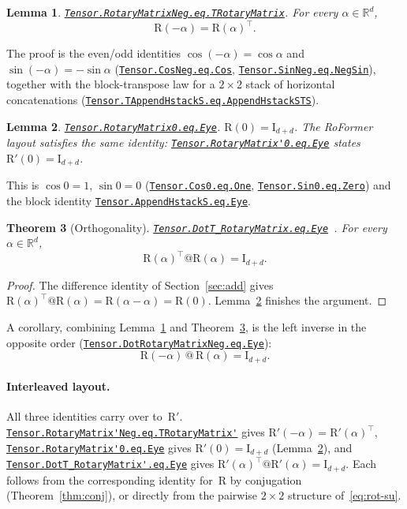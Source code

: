 \documentclass[11pt,a4paper]{article}
\newcommand{\lmod}[1]{\href{http://www.lemma.cn/lean/?module=#1}{\nolinkurl{#1}}}
\newtheorem{theorem}{Theorem}[section]
\newtheorem{lemma}[theorem]{Lemma}
\newcommand{\R}{\mathbb{R}}
\newcommand{\rot}{\mathrm{R}}
\newcommand{\eye}{\mathrm{I}}
\begin{document}
\begin{lemma}
\label{lem:neg-T}
\lmod{Tensor.RotaryMatrixNeg.eq.TRotaryMatrix}.
For every \(\alpha\in\R^d\),
\begin{equation}
  \rot(-\alpha) = \rot(\alpha)^\top.
\end{equation}
\end{lemma}

The proof is the even/odd identities \(\cos(-\alpha)=\cos\alpha\) and \(\sin(-\alpha)=-\sin\alpha\)
(\lmod{Tensor.CosNeg.eq.Cos}, \lmod{Tensor.SinNeg.eq.NegSin}),
together with the block-transpose law for a \(2\times 2\) stack of horizontal concatenations
(\lmod{Tensor.TAppendHstackS.eq.AppendHstackSTS}).

\begin{lemma}
\label{lem:R0}
\lmod{Tensor.RotaryMatrix0.eq.Eye}.
\(\rot(0)=\eye_{d+d}\).
The RoFormer layout satisfies the same identity:
\lmod{Tensor.RotaryMatrix'0.eq.Eye} states \(\rot'(0)=\eye_{d+d}\).
\end{lemma}

This is \(\cos 0=1\), \(\sin 0=0\)
(\lmod{Tensor.Cos0.eq.One}, \lmod{Tensor.Sin0.eq.Zero})
and the block identity
\lmod{Tensor.AppendHstackS.eq.Eye}.

\begin{theorem}[Orthogonality]
\label{thm:orth}
\lmod{Tensor.DotT_RotaryMatrix.eq.Eye}~\cite{lemma_rope_orth}.
For every \(\alpha\in\R^d\),
\begin{equation}
  \rot(\alpha)^\top @ \rot(\alpha) = \eye_{d+d}.
\end{equation}
\end{theorem}

\begin{proof}
The difference identity of Section~\ref{sec:add} gives
\(\rot(\alpha)^\top @ \rot(\alpha)=\rot(\alpha-\alpha)=\rot(0)\).
Lemma~\ref{lem:R0} finishes the argument.
\end{proof}

A corollary, combining Lemma~\ref{lem:neg-T} and Theorem~\ref{thm:orth}, is the left inverse in the opposite order
(\lmod{Tensor.DotRotaryMatrixNeg.eq.Eye}):
\begin{equation}
  \rot(-\alpha)\,@\,\rot(\alpha) = \eye_{d+d}.
\end{equation}

\paragraph{Interleaved layout.}
All three identities carry over to~\(\rot'\).
\lmod{Tensor.RotaryMatrix'Neg.eq.TRotaryMatrix'} gives \(\rot'(-\alpha)=\rot'(\alpha)^\top\),
\lmod{Tensor.RotaryMatrix'0.eq.Eye} gives \(\rot'(0)=\eye_{d+d}\) (Lemma~\ref{lem:R0}),
and \lmod{Tensor.DotT_RotaryMatrix'.eq.Eye} gives
\(\rot'(\alpha)^\top @ \rot'(\alpha) = \eye_{d+d}\).
Each follows from the corresponding identity for~\(\rot\) by conjugation (Theorem~\ref{thm:conj}), or directly from the pairwise \(2\times 2\) structure of~\eqref{eq:rot-su}.
\end{document}
